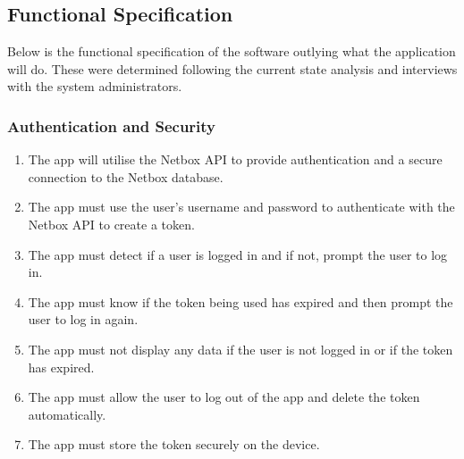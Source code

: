 \documentclass [11pt,a4paper]{article}
\begin{document}
\pagebreak

\subsection{Functional Specification}
\label{sec:func_spec}

Below is the functional specification of the software outlying what the application will do. These were determined following the current state analysis and interviews with the system administrators. 
\subsubsection{Authentication and Security}
\label{sec:spec_auth}
\begin{enumerate}[label={\fbox{AUTH\_SPEC\_\arabic*}}, leftmargin=*, labelindent=\parindent]
    \item The app will utilise the Netbox API to provide authentication and a secure connection to the Netbox database.  \label{spec_auth_1}
    \item The app must use the user's username and password to authenticate with the Netbox API to create a token. \label{spec_auth_2}
    \item The app must detect if a user is logged in and if not, prompt the user to log in. \label{spec_auth_3}
    \item The app must know if the token being used has expired and then prompt the user to log in again. \label{spec_auth_4}
    \item The app must not display any data if the user is not logged in or if the token has expired. \label{spec_auth_5}
    \item The app must allow the user to log out of the app and delete the token automatically. \label{spec_auth_6}
    \item The app must store the token securely on the device. \label{spec_auth_7}
\end{enumerate}
\end{document}

